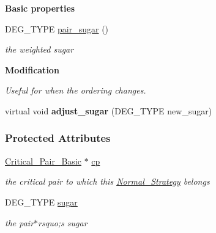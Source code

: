 \begin{Indent}\textbf{ Basic properties}\par
\begin{DoxyCompactItemize}
\item 
\mbox{\label{group__strategygroup_abaf1d3aa2eb6b7fef429be8f27e2c7b8}} 
D\+E\+G\+\_\+\+T\+Y\+PE \hyperlink{group__strategygroup_abaf1d3aa2eb6b7fef429be8f27e2c7b8}{pair\+\_\+sugar} ()
\begin{DoxyCompactList}\small\item\em the weighted sugar \end{DoxyCompactList}\end{DoxyCompactItemize}
\end{Indent}
\begin{Indent}\textbf{ Modification}\par
{\em Useful for when the ordering changes. }\begin{DoxyCompactItemize}
\item 
\mbox{\label{group__strategygroup_a5288aef295d144401e9c0a7c08c40a66}} 
virtual void {\bfseries adjust\+\_\+sugar} (D\+E\+G\+\_\+\+T\+Y\+PE new\+\_\+sugar)
\end{DoxyCompactItemize}
\end{Indent}
\subsubsection*{Protected Attributes}
\begin{DoxyCompactItemize}
\item 
\mbox{\label{group__strategygroup_ad64f04d4feffa02e64ff4837b55a7def}} 
\hyperlink{group___g_b_computation_class_critical___pair___basic}{Critical\+\_\+\+Pair\+\_\+\+Basic} $\ast$ \hyperlink{group__strategygroup_ad64f04d4feffa02e64ff4837b55a7def}{cp}
\begin{DoxyCompactList}\small\item\em the critical pair to which this {\ttfamily \hyperlink{group__strategygroup_class_normal___strategy}{Normal\+\_\+\+Strategy}} belongs \end{DoxyCompactList}\item 
\mbox{\label{group__strategygroup_a6bd5a8eb9113fd93475c06e30da44bb8}} 
D\+E\+G\+\_\+\+T\+Y\+PE \hyperlink{group__strategygroup_a6bd5a8eb9113fd93475c06e30da44bb8}{sugar}
\begin{DoxyCompactList}\small\item\em the pair$\ast$rsquo;s sugar \end{DoxyCompactList}\end{DoxyCompactItemize}
\label{class_poly___strategy___data}
